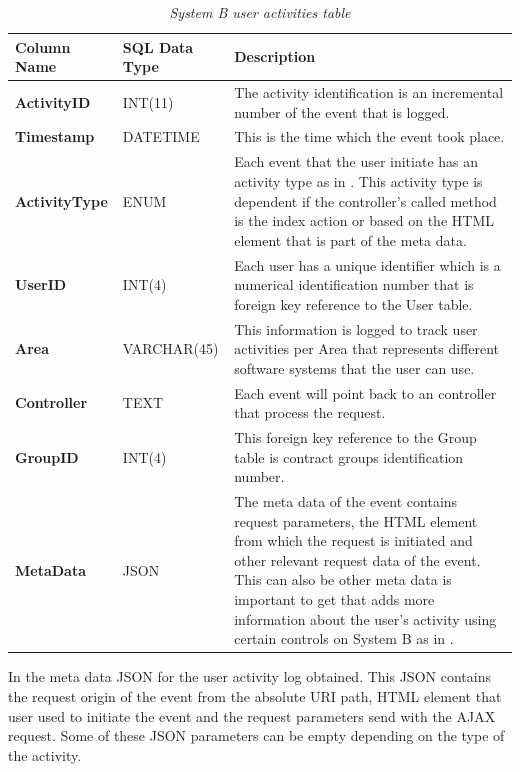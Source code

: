 \begin{table}[!htb]
	\centering
	\small
	\caption[System B user activities table]
	{\textit{System B user activities table}}
	\label{tbl:CH2_SystemB_LoggingTable}
	\begin{tabularx}{\textwidth}{|l|l|X|}
		\hline \textbf{Column Name} & \textbf{SQL Data Type} & \textbf{Description} \\
		\hline \textbf{ActivityID} & INT(11) & The activity identification is an incremental number of the event that is logged.\\
		\hline \textbf{Timestamp} & DATETIME & This is the time which the event took place.\\
		\hline \textbf{ActivityType} & ENUM & Each event that the user initiate has an activity type as in \Cref{tbl:Ch2_SystemB_ActivityTypes}. This activity type is dependent if the controller's called method is the index action or based on the HTML element that is part of the meta data. \\
		\hline \textbf{UserID} & INT(4) & Each user has a unique identifier which is a numerical identification number that is foreign key reference to the User table. \\
		\hline \textbf{Area} & VARCHAR(45) & This information is logged to track user activities per Area that represents different software systems that the user can use. \\
		\hline \textbf{Controller} & TEXT & Each event will point back to an controller that process the request. \\
		\hline \textbf{GroupID} & INT(4) & This foreign key reference to the Group table is contract groups identification number. \\
		\hline \textbf{MetaData} & JSON & The meta data of the event contains request parameters, the HTML element from which the request is initiated and other relevant request data of the event. This can also be other meta data is important to get that adds more information about the user's activity using certain controls on System B as in \Cref{fig:CH2_SystemBMetaData}. \\
		\hline
	\end{tabularx}
\end{table}

In  the meta data JSON for the user activity log obtained. This JSON contains the request origin of the event from the absolute URI path, HTML element that user used to initiate the event and the request parameters send with the AJAX request. Some of these JSON parameters can be empty depending on the type of the activity.

